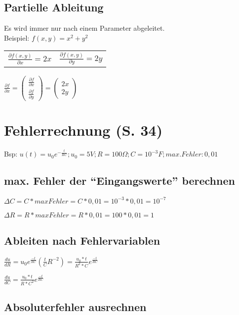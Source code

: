 \documentclass[a4paper, 12pt]{article}
\begin{document}
\subsection{Partielle Ableitung}
Es wird immer nur nach einem Parameter abgeleitet.\\
Beispiel: $f(x,y)= x^2 + y^2$ \\
\newline \begin{tabular}{l r}
$\frac{\partial f(x,y)}{\partial x}= 2x$ & $\frac{\partial f(x,y)}{\partial 
y}=2y$\\
\end{tabular}

$\frac{\partial f}{\partial x} = 
\begin{pmatrix}
	\frac{\partial f}{\partial x} \\
	\frac{\partial f}{\partial y}
\end{pmatrix}
= 
\begin{pmatrix}
	2x\\
	2y
\end{pmatrix}$ \newline

\section{Fehlerrechnung (S. 34)}

Bsp: $u(t) = u_0 e^{- \frac{t}{R C}}; u_0 = 5V; R = 100 \Omega; C =
10^{-3}F; max. Fehler: 0,01 $
\subsection { max. Fehler der ``Eingangswerte'' berechnen }

$ \Delta C = C * maxFehler = C * 0,01 = 10^{-3} * 0,01 = 10^{-7} $

$ \Delta R = R * maxFehler = R * 0,01 = 100 * 0,01 = 1 $

\subsection { Ableiten nach Fehlervariablen}

$\frac {du} {dR} = u_0 e^{\frac{-t}{RC}} (\frac{t}{C}R^{-2}) = \frac{u_0 *
	t}{R^2 * C} e^{\frac{-t}{RC}}$

	$\frac {du} {dC} = \frac{u_0 *
		t}{R * C^2} e^{\frac{-t}{RC}}$

		\subsection { Absoluterfehler ausrechnen}
\end{document}
